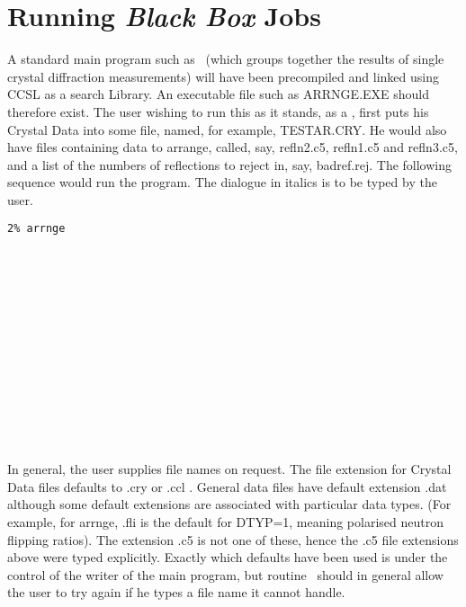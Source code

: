 \section{Running \emph{Black Box} Jobs}
A standard main program such as \ (which groups together the
results of single crystal diffraction measurements) will have been
precompiled and linked using CCSL as a search Library.  An executable file
such as ARRNGE.EXE should therefore exist.
The user wishing to run this as it stands, as a , first puts
his Crystal Data into some file, named, for example, TESTAR.CRY.
\pn
He would also have files containing data to arrange, called, 
say, \mbox{refln2.c5}, \mbox{refln1.c5}
and \mbox{refln3.c5}, and a list of the numbers of reflections to 
reject in, say, \mbox{badref.rej}.\p
The following sequence would run the program.
The dialogue in italics is to be typed by the user.\p
\begin{list} {} {\setlength{\labelwidth}{25mm}
  \setlength{\parsep}{-1ex}
  \setlength{\leftmargin}{5mm}}
\item\texttt{2\% arrnge}
\item{}\\
\item{}\\
\item{}\\
\item{}\\
\item{}\\
\item{}\\
\ms 
\item{}\\ 
\ms 
\item{}\ssp
\end{list} 
 
In general, the user supplies file names on request.  The file extension
for Crystal Data files defaults to .cry or .ccl . General data 
files have default extension .dat although some default extensions are
associated with particular data types. (For example, for \mbox{arrnge,} .fli is
the default for DTYP=1, meaning
polarised neutron flipping ratios). The extension .c5 is not one of
these, hence the .c5 file
extensions above were typed explicitly.  Exactly which defaults have been
used is under the control of the writer of the main program, but
routine \ should in general allow the user to try again if he types
a file name it cannot handle.\p
